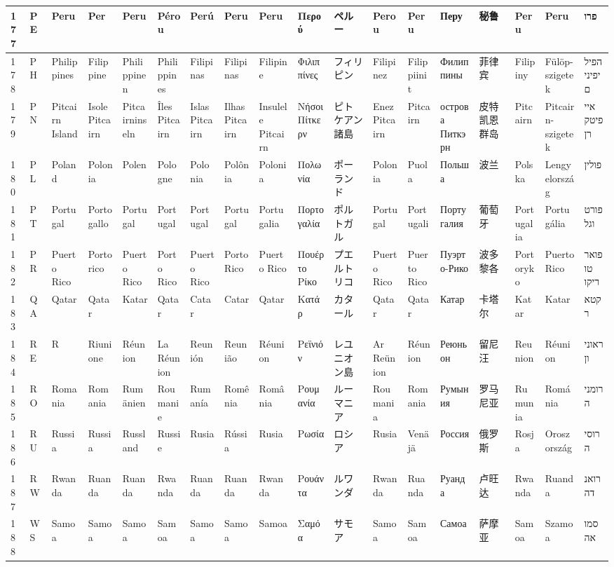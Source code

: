 \begin{longtable}{|l|l|l|l|l|l|l|l|l|l|l|l|l|l|l|l|l|l|}
177 & PE & Peru & Per & Peru & Pérou & Perú & Peru & Peru & Περού & ペルー & Perou & Peru & Перу & 秘鲁 & Peru & Peru & פרו \\ \hline 
178 & PH & Philippines & Filippine & Philippinen & Philippines & Filipinas & Filipinas & Filipine & Φιλιππίνες & フィリピン & Filipinez & Filippiinit & Филиппины & 菲律宾 & Filipiny & Fülöp-szigetek & הפיליפינים \\ \hline 
179 & PN & Pitcairn Island & Isole Pitcairn & Pitcairninseln & Îles Pitcairn & Islas Pitcairn & Ilhas Pitcairn & Insulele Pitcairn & Νήσοι Πίτκερν & ピトケアン諸島 & Enez Pitcairn & Pitcairn & острова Питкэрн & 皮特凯恩群岛 & Pitcairn & Pitcairn-szigetek & איי פיטקרן \\ \hline 
180 & PL & Poland & Polonia & Polen & Pologne & Polonia & Polônia & Polonia & Πολωνία & ポーランド & Polonia & Puola & Польша & 波兰 & Polska & Lengyelország & פולין \\ \hline 
181 & PT & Portugal & Portogallo & Portugal & Portugal & Portugal & Portugal & Portugalia & Πορτογαλία & ポルトガル & Portugal & Portugali & Португалия & 葡萄牙 & Portugalia & Portugália & פורטוגל \\ \hline 
182 & PR & Puerto Rico & Portorico & Puerto Rico & Porto Rico & Puerto Rico & Porto Rico & Puerto Rico & Πουέρτο Ρίκο & プエルトリコ & Puerto Rico & Puerto Rico & Пуэрто-Рико & 波多黎各 & Portoryko & Puerto Rico & פוארטו ריקו \\ \hline 
183 & QA & Qatar & Qatar & Katar & Qatar & Catar & Catar & Qatar & Κατάρ & カタール & Qatar & Qatar & Катар & 卡塔尔 & Katar & Katar & קטאר \\ \hline 
184 & RE & R & Riunione & Réunion & La Réunion & Reunión & Reunião & Réunion & Ρεϊνιόν & レユニオン島 & Ar Reünion & Réunion & Реюньон & 留尼汪 & Reunion & Réunion & ראוניון \\ \hline 
185 & RO & Romania & Romania & Rumänien & Roumanie & Rumanía & Romênia & România & Ρουμανία & ルーマニア & Roumania & Romania & Румыния & 罗马尼亚 & Rumunia & Románia & רומניה \\ \hline 
186 & RU & Russia & Russia & Russland & Russie & Rusia & Rússia & Rusia & Ρωσία & ロシア & Rusia & Venäjä & Россия & 俄罗斯 & Rosja & Oroszország & רוסיה \\ \hline 
187 & RW & Rwanda & Ruanda & Ruanda & Rwanda & Ruanda & Ruanda & Rwanda & Ρουάντα & ルワンダ & Rwanda & Ruanda & Руанда & 卢旺达 & Rwanda & Ruanda & רואנדה \\ \hline 
188 & WS & Samoa & Samoa & Samoa & Samoa & Samoa & Samoa & Samoa & Σαμόα & サモア & Samoa & Samoa & Самоа & 萨摩亚 & Samoa & Szamoa & סמואה \\ \hline 

\end{longtable}
